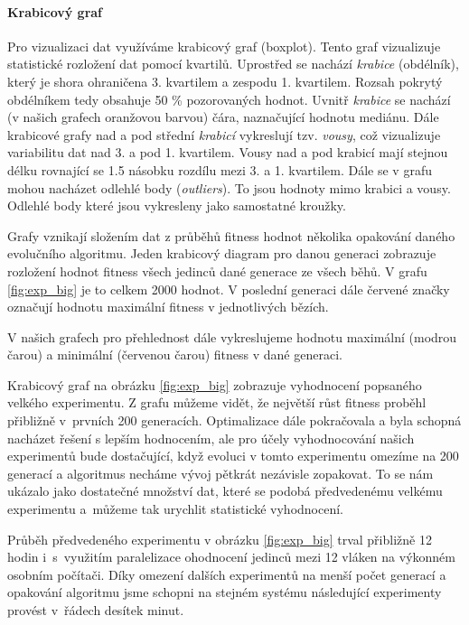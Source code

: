 \paragraph{Krabicový graf}
Pro vizualizaci dat využíváme krabicový graf (boxplot). Tento graf vizualizuje
statistické rozložení dat pomocí kvartilů. Uprostřed se nachází \emph{krabice}
(obdélník), který je shora ohraničena 3. kvartilem a zespodu 1. kvartilem.
Rozsah pokrytý obdélníkem tedy obsahuje 50 \% pozorovaných hodnot. Uvnitř
\emph{krabice} se nachází (v našich grafech oranžovou barvou) čára, naznačující
hodnotu mediánu. Dále krabicové grafy nad a pod střední \emph{krabicí}
vykreslují tzv. \emph{vousy}, což vizualizuje variabilitu dat nad 3. a pod 1.
kvartilem. Vousy nad a pod krabicí mají stejnou délku rovnající se 1.5 násobku
rozdílu mezi 3. a 1. kvartilem. Dále se v grafu mohou nacházet odlehlé body
(\emph{outliers}). To jsou hodnoty mimo krabici a vousy. Odlehlé body které
jsou vykresleny jako samostatné kroužky.

Grafy vznikají složením dat z průběhů fitness hodnot několika opakování daného
evolučního algoritmu. Jeden krabicový diagram pro danou generaci zobrazuje
rozložení hodnot fitness všech jedinců dané generace ze všech běhů. V grafu
\ref{fig:exp_big} je to celkem 2000 hodnot. V poslední generaci dále červené
značky označují hodnotu maximální fitness v jednotlivých bězích. 

V našich grafech pro přehlednost dále vykreslujeme hodnotu maximální (modrou
čarou) a minimální (červenou čarou) fitness v dané generaci.

Krabicový graf na obrázku \ref{fig:exp_big} zobrazuje vyhodnocení popsaného
velkého experimentu. Z grafu můžeme vidět, že největší růst fitness proběhl
přibližně v~prvních 200 generacích. Optimalizace dále pokračovala a byla
schopná nacházet řešení s lepším hodnocením, ale pro účely vyhodnocování našich 
experimentů bude dostačující, když evoluci v tomto experimentu omezíme na 200
generací a algoritmus necháme vývoj pětkrát nezávisle zopakovat. To se nám
ukázalo jako dostatečné množství dat, které se podobá předvedenému velkému
experimentu a~můžeme tak urychlit statistické vyhodnocení. 

Průběh předvedeného experimentu v obrázku \ref{fig:exp_big} trval přibližně 12
hodin i~s~využitím paralelizace ohodnocení jedinců mezi 12 vláken na výkonném
osobním počítači. Díky omezení dalších experimentů na menší počet generací a
opakování algoritmu jsme schopni na stejném systému následující experimenty
provést v~řádech desítek minut.

